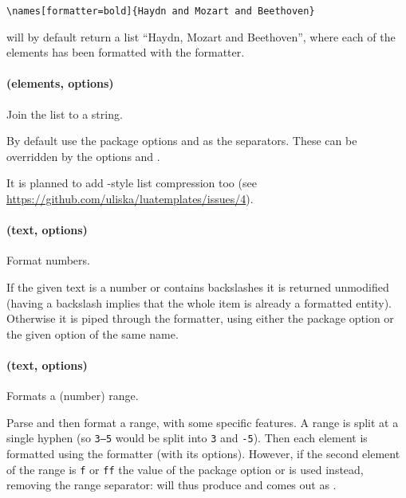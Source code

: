 \documentclass{scrartcl}
\begin{document}
\begin{verbatim}
\names[formatter=bold]{Haydn and Mozart and Beethoven}
\end{verbatim}

\noindent will by default return a list “Haydn, Mozart and Beethoven”, where
each of the elements has been formatted with the  formatter.


\paragraph{ (elements, options)}

Join the list to a string.

By default use the package options  and 
as the separators. These can be overridden  by the options 
and .

It is planned to add -style list compression too (see
\url{https://github.com/uliska/luatemplates/issues/4}).


\paragraph{ (text, options)}

Format numbers.

If the given text is a number or contains backslashes it is returned unmodified
(having a backslash implies that the whole item is already a formatted
entity). Otherwise it is piped through the  formatter, using either
the package option  or the given option of the same name.


\paragraph{ (text, options)}

Formats a (number) range.

Parse and then format a range, with some specific features.  A range is split at
a single hyphen (so \texttt{3--5} would be split into \texttt{3} and
\texttt{-5}).  Then each element is formatted using the 
formatter (with its options).  However, if the second element of the range is
\texttt{f} or \texttt{ff} the value of the package option 
or  is used instead, removing the range separator:
\texttt{} will thus produce  and
\texttt{} comes out as
.
\end{document}

